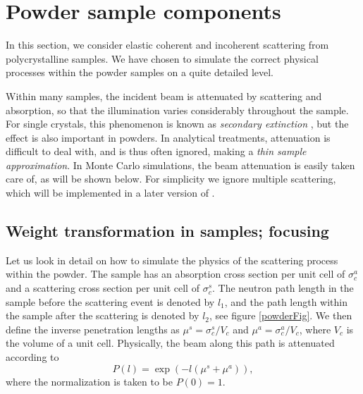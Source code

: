 
\section{Powder sample components}
\label{powder}
In this section, we consider elastic coherent and incoherent
scattering from polycrystalline samples. We have chosen to
simulate the correct physical processes within the powder
samples on a quite detailed level.

Within many samples,
the incident beam is attenuated by scattering and absorption,
so that the illumination varies considerably throughout the sample.
For single crystals, this phenomenon is known as
{\em secondary extinction} \cite{bacon}, but the effect is
also important in powders.
In analytical treatments, attenuation is difficult to deal with,
and is thus often ignored, making a {\em thin sample approximation}.
In Monte Carlo simulations, the beam attenuation
is easily taken care of, as will be shown below.
For simplicity we ignore multiple scattering, which will
be implemented in a later version of \MCX .

\subsection{Weight transformation in samples; focusing}
Let us look in detail on how to simulate the physics of the scattering
process within the powder.
The sample has an absorption cross section per unit cell of
$\sigma_c^a$ and a scattering cross section per unit cell
of $\sigma_c^s$. The neutron path length
in the sample before the scattering event is denoted by $l_1$, and
the path length within the sample after the scattering
is denoted by $l_2$, see figure \ref{powderFig}.
We then define the inverse penetration lengths as
$\mu^s = \sigma_c^s / V_c$ and $\mu^a = \sigma_c^a / V_c$, where
$V_c$ is the volume of a unit cell. Physically, the beam
along this path is attenuated according to
\begin{equation}
P(l) = \exp(- l (\mu^s + \mu^a)) ,
\end{equation}
where the normalization is taken to be $P(0)=1$.

